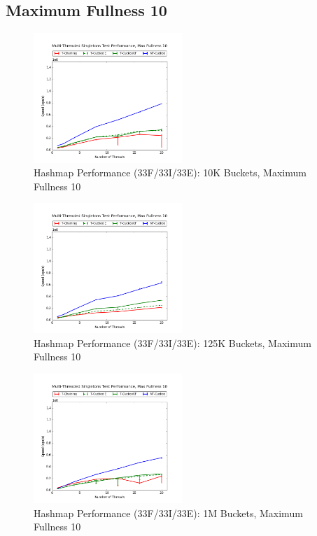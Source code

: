 \subsection{Maximum Fullness 10}

\begin{figure}[H]
    \centering
    \caption{Hashmap Performance (33F/33I/33E): 10K Buckets, Maximum Fullness 10}
    \includegraphics[width=0.5\textwidth]{maps/10HM10K:F34,I33,E33.png} 
    
\end{figure}

\begin{figure}[H]
    \centering
    \caption{Hashmap Performance (33F/33I/33E): 125K Buckets, Maximum Fullness 10}
    \includegraphics[width=0.5\textwidth]{maps/10HM125K:F34,I33,E33.png} 
    
\end{figure}

\begin{figure}[H]
    \centering
    \caption{Hashmap Performance (33F/33I/33E): 1M Buckets, Maximum Fullness 10}
    \includegraphics[width=0.5\textwidth]{maps/10HM1M:F34,I33,E33.png} 
    
\end{figure}

